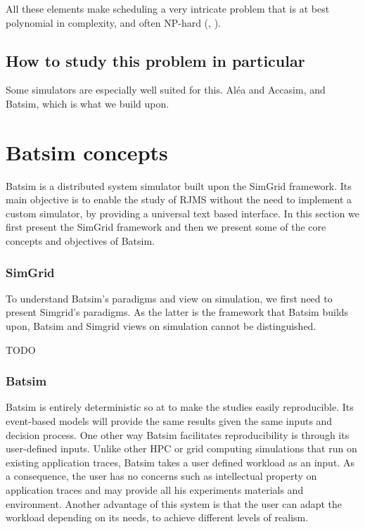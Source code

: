 \documentclass[12pt, a4paper]{memoir}
\begin{document}
All these elements make scheduling a very intricate problem that is at best
polynomial in complexity, and often NP-hard (\cite{10.1016/S0022-0000(75)80008-0}, \cite{scheduler-complexity}).

\subsection{How to study this problem in particular}
Some simulators are especially well suited for this.
Aléa and Accasim, and Batsim, which is what we build upon.

\section{Batsim concepts}

Batsim\cite{dutot:hal-01333471} is a distributed system simulator built upon
the SimGrid framework. Its main objective is to enable the study of RJMS
without the need to implement a custom simulator, by providing a universal text
based interface. In this section we first present the SimGrid framework and then we present some of the core concepts and objectives of Batsim.

\subsubsection{SimGrid}

To understand Batsim's paradigms and view on simulation, we first need to
present Simgrid's paradigms. As the latter is the framework that Batsim builds
upon, Batsim and Simgrid views on simulation cannot be distinguished.

TODO

\subsubsection{Batsim}

Batsim is entirely deterministic so at to make the studies easily reproducible.
Its event-based models will provide the same results given the same inputs and
decision process. One other way Batsim facilitates reproducibility is through
its user-defined inputs. Unlike other HPC or grid computing simulations that
run on existing application traces, Batsim takes a user defined workload as an
input. As a consequence, the user has no concerns such as intellectual property
on application traces and may provide all his experiments materials and
environment.  Another advantage of this system is that the user can adapt the
workload depending on its needs, to achieve different levels of realism.
\end{document}
